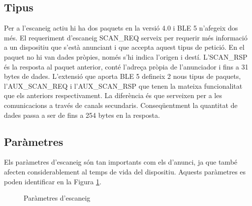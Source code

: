 \subsection{Tipus}
Per a l'escaneig actiu hi ha dos paquets en la versió 4.0 i BLE 5 n'afegeix dos més.
El requeriment d'escaneig SCAN\_REQ serveix per requerir més informació a un dispositiu que s'està anunciant i que accepta aquest tipus de petició.
En el paquet no hi van dades pròpies, només s'hi indica l'origen i destí.
L'SCAN\_RSP és la resposta al paquet anterior, conté l'adreça pròpia de l'anunciador i fins a 31 bytes de dades.
L'extensió que aporta BLE 5 defineix 2 nous tipus de paquets, l'AUX\_SCAN\_REQ i l'AUX\_SCAN\_RSP que tenen la mateixa funcionalitat que els anteriors respectivament.
La diferència és que serveixen per a les comunicacions a través de canals secundaris.
Conseqüentment la quantitat de dades passa a ser de fins a 254 bytes en la resposta.

\subsection{Paràmetres}
Els paràmetres d'escaneig són tan importants com els d'anunci, ja que també afecten considerablement al temps de vida del dispositiu.
Aquests paràmetres es poden identificar en la Figura \ref{fig:escaneig_canals}.

\begin{figure}[!h]
	\begin{center}
		\begin{subfigmatrix}{1}
		\end{subfigmatrix}
	\end{center}
	\caption{Paràmetres d'escaneig \cite{advertisment_params} }
	\label{fig:escaneig_canals}
\end{figure}


